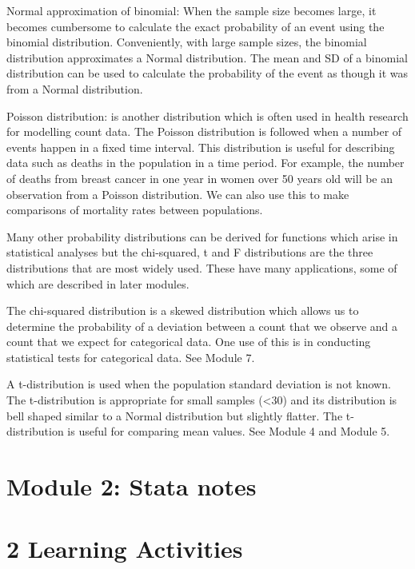 \documentclass[
]{memoir}
\begin{document}
Normal approximation of binomial: When the sample size becomes large, it becomes cumbersome to calculate the exact probability of an event using the binomial distribution. Conveniently, with large sample sizes, the binomial distribution approximates a Normal distribution. The mean and SD of a binomial distribution can be used to calculate the probability of the event as though it was from a Normal distribution.

Poisson distribution: is another distribution which is often used in health research for modelling count data. The Poisson distribution is followed when a number of events happen in a fixed time interval. This distribution is useful for describing data such as deaths in the population in a time period. For example, the number of deaths from breast cancer in one year in women over 50 years old will be an observation from a Poisson distribution. We can also use this to make comparisons of mortality rates between populations.

Many other probability distributions can be derived for functions which arise in statistical analyses but the chi-squared, t and F distributions are the three distributions that are most widely used. These have many applications, some of which are described in later modules.

The chi-squared distribution is a skewed distribution which allows us to determine the probability of a deviation between a count that we observe and a count that we expect for categorical data. One use of this is in conducting statistical tests for categorical data. See Module 7.

A t-distribution is used when the population standard deviation is not known. The t-distribution is appropriate for small samples (\textless30) and its distribution is bell shaped similar to a Normal distribution but slightly flatter. The t-distribution is useful for comparing mean values. See Module 4 and Module 5.

\hypertarget{module-2-stata-notes}{%
\chapter*{\texorpdfstring{\textbf{Module 2: Stata notes}}{Module 2: Stata notes}}\label{module-2-stata-notes}}

\hypertarget{learning-activities-1}{%
\chapter*{\texorpdfstring{\textbf{2} Learning Activities}{2 Learning Activities}}\label{learning-activities-1}}
\end{document}
